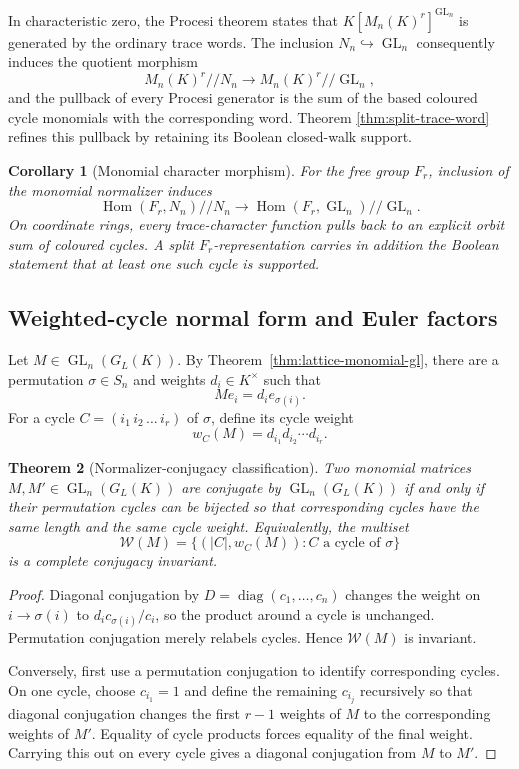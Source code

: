 \documentclass[11pt]{amsart}
\numberwithin{equation}{section}
\newtheorem{theorem}{Theorem}[section]
\newtheorem{corollary}[theorem]{Corollary}
\theoremstyle{definition}
\newcommand{\Hom}{\operatorname{Hom}}
\newcommand{\GL}{\operatorname{GL}}
\begin{document}
In characteristic zero, the Procesi theorem states that
$K[M_n(K)^r]^{\GL_n}$ is generated by the ordinary trace words.  The
inclusion $N_n\hookrightarrow\GL_n$ consequently induces the quotient
morphism
\[
M_n(K)^r/\!/N_n\longrightarrow M_n(K)^r/\!/\GL_n,
\]
and the pullback of every Procesi generator is the sum of the based coloured
cycle monomials with the corresponding word.  Theorem
\ref{thm:split-trace-word} refines this pullback by retaining its Boolean
closed-walk support.

\begin{corollary}[Monomial character morphism]
\label{cor:monomial-character-morphism}
For the free group $F_r$, inclusion of the monomial normalizer induces
\[
\Hom(F_r,N_n)/\!/N_n
\longrightarrow
\Hom(F_r,\GL_n)/\!/\GL_n.
\]
On coordinate rings, every trace-character function pulls back to an
explicit orbit sum of coloured cycles.  A split $F_r$-representation carries
in addition the Boolean statement that at least one such cycle is supported.
\end{corollary}


\subsection{Weighted-cycle normal form and Euler factors}

Let $M\in\GL_n(G_L(K))$.  By
Theorem~\ref{thm:lattice-monomial-gl}, there are a permutation
$\sigma\in S_n$ and weights $d_i\in K^\times$ such that
\[
M e_i=d_i e_{\sigma(i)}.
\]
For a cycle $C=(i_1\,i_2\,\dots\,i_r)$ of $\sigma$, define its cycle
weight
\[
w_C(M)=d_{i_1}d_{i_2}\cdots d_{i_r}.
\]

\begin{theorem}[Normalizer-conjugacy classification]
\label{thm:weighted-cycle-classification}
Two monomial matrices $M,M'\in\GL_n(G_L(K))$ are conjugate by
$\GL_n(G_L(K))$ if and only if their permutation cycles can be bijected so
that corresponding cycles have the same length and the same cycle weight.
Equivalently, the multiset
\[
\mathcal W(M)=\{(|C|,w_C(M)):C\text{ a cycle of }\sigma\}
\]
is a complete conjugacy invariant.
\end{theorem}

\begin{proof}
Diagonal conjugation by $D=\operatorname{diag}(c_1,\dots,c_n)$ changes the
weight on $i\to\sigma(i)$ to
$d_i c_{\sigma(i)}/c_i$, so the product around a cycle is unchanged.
Permutation conjugation merely relabels cycles.  Hence $\mathcal W(M)$ is
invariant.

Conversely, first use a permutation conjugation to identify corresponding
cycles.  On one cycle, choose $c_{i_1}=1$ and define the remaining
$c_{i_j}$ recursively so that diagonal conjugation changes the first
$r-1$ weights of $M$ to the corresponding weights of $M'$.  Equality of
cycle products forces equality of the final weight.  Carrying this out on
every cycle gives a diagonal conjugation from $M$ to $M'$.
\end{proof}
\end{document}
